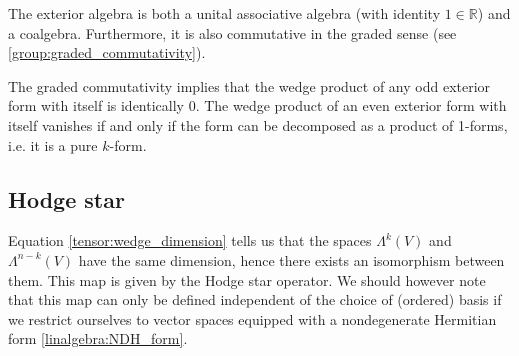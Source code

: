 
	
	\begin{property}
		The exterior algebra is both a unital associative algebra (with identity $1\in\mathbb{R}$) and a coalgebra. Furthermore, it is also commutative in the graded sense (see \ref{group:graded_commutativity}).
	\end{property}
	
	\begin{property}
		The graded commutativity implies that the wedge product of any odd exterior form with itself is identically 0. The wedge product of an even exterior form with itself vanishes if and only if the form can be decomposed as a product of 1-forms, i.e. it is a pure $k$-form.
	\end{property}
	
\subsection{Hodge star}

	Equation \ref{tensor:wedge_dimension} tells us that the spaces $\Lambda^k(V)$ and $\Lambda^{n-k}(V)$ have the same dimension, hence there exists an isomorphism between them. This map is given by the Hodge star operator. We should however note that this map can only be defined independent of the choice of (ordered) basis if we restrict ourselves to vector spaces equipped with a nondegenerate Hermitian form \ref{linalgebra:NDH_form}.

